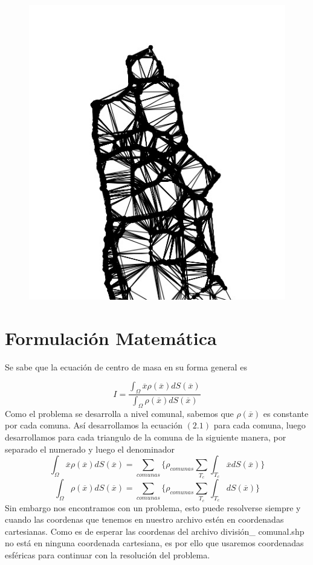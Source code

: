 \documentclass[20pt]{report}
\begin{document}
\begin{itemize}
\begin{figure}[H]
{    \includegraphics[scale=1]{chile2.jpg} 
    }
    \centering
\end{figure}

\label{cap.introduccion}\section{Formulaci\'on Matem\'atica}
Se sabe que la ecuaci\'on de centro de masa en su forma general es 

\begin{equation}
I=\dfrac{\int_{\Omega} \overline{x}\rho(\overline{x}) dS(\overline{x}) }{\int_{\Omega} \rho(\overline{x}) dS(\overline{x}) }
\end{equation}
Como el problema se desarrolla a nivel comunal,  sabemos que $\rho(\overline{x})$ es constante por cada comuna. As\'i  desarrollamos la ecuaci\'on $(2.1)$ para cada comuna, luego desarrollamos para cada triangulo de la comuna de la siguiente manera, por separado el numerado y luego el denominador
\begin{equation}
\int_{\Omega} \overline{x}\rho(\overline{x}) dS(\overline{x})=\sum_{comunas} \lbrace \rho_{comunas} \sum_{T_c} \int_{T_c} \overline{x} dS(\overline{x}) \rbrace 
\end{equation}
\begin{equation}
\int_{\Omega} \rho(\overline{x}) dS(\overline{x})=\sum_{comunas} \lbrace \rho_{comunas} \sum_{T_c} \int_{T_c}  dS(\overline{x}) \rbrace 
\end{equation}
Sin embargo nos encontramos con un problema, esto puede resolverse siempre y cuando las coordenas que tenemos en nuestro archivo est\'en en coordenadas cartesianas. Como es de esperar las coordenas del archivo divisi\'on\_ comunal.shp no est\'a en ninguna coordenada cartesiana, es por ello que  usaremos coordenadas esf\'ericas para continuar con la resoluci\'on del problema.\\


\end{itemize}
\end{document}
